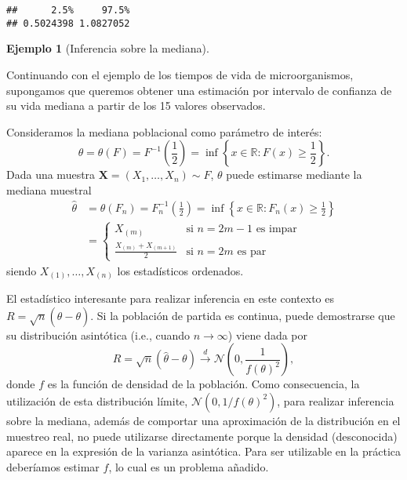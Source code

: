 \documentclass[
]{book}
\theoremstyle{break}
\theoremstyle{definition}
\theoremstyle{definition}
\newtheorem{example}{Ejemplo}[chapter]
\theoremstyle{definition}
\theoremstyle{remark}
\begin{document}
\begin{verbatim}
##      2.5%     97.5% 
## 0.5024398 1.0827052
\end{verbatim}

\begin{example}[Inferencia sobre la mediana]
\protect\hypertarget{exm:mediana}{}{\label{exm:mediana} \iffalse (Inferencia sobre la mediana) \fi{} } \vspace{0.5cm}

Continuando con el ejemplo de los tiempos de vida de microorganismos,
supongamos que queremos obtener una estimación por intervalo de confianza
de su vida mediana a partir de los 15 valores observados.
\end{example}

Consideramos la mediana poblacional como parámetro de interés:
\[\theta = \theta \left( F \right) = F^{-1}\left( \frac{1}{2} \right) 
= \inf \left\{ x\in \mathbb{R} : F\left( x \right) \geq \frac{1}{2}\right\}.\]
Dada una muestra \(\mathbf{X}=\left( X_1,\ldots ,X_n \right) \sim F\), \(\theta\) puede estimarse mediante la mediana muestral
\[\begin{aligned}
\hat{\theta} &= \theta \left( F_n \right) =F_n^{-1}\left( \frac{1}{2} \right) 
=\inf \left\{ x\in \mathbb{R} : F_n\left( x \right) \geq \frac{1}{2}
\right\} \\
&= \left\{ 
\begin{array}{ll}
X_{(m)} & \text{si } n=2m-1 \text{ es impar} \\ 
\frac{X_{(m)}+X_{\left( m+1 \right)}}{2} & \text{si } n=2m \text{ es par}
\end{array}
\right.
\end{aligned}\]
siendo \(X_{(1)},\ldots ,X_{(n)}\) los estadísticos ordenados.

El estadístico interesante para realizar inferencia en este contexto es
\(R=\sqrt{n}\left( \hat{\theta}-\theta \right)\). Si la población de
partida es continua, puede demostrarse que su distribución asintótica
(i.e., cuando \(n \rightarrow \infty\)) viene dada por
\[R=\sqrt{n}\left( \hat{\theta}-\theta \right) \overset{d}{\rightarrow }
\mathcal{N}\left( 0,\frac{1}{f\left( \theta \right)^2} \right),\]donde \(f\) es
la función de densidad de la población. Como consecuencia, la
utilización de esta distribución límite,
\(\mathcal{N}\left( 0, 1/f\left( \theta \right)^2 \right)\), para realizar
inferencia sobre la mediana, además de comportar una aproximación de la
distribución en el muestreo real, no puede utilizarse directamente
porque la densidad (desconocida) aparece en la expresión de la varianza
asintótica. Para ser utilizable en la práctica deberíamos estimar \(f\),
lo cual es un problema añadido.
\end{document}

